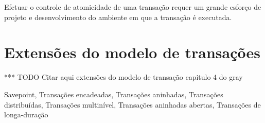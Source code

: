 \documentclass[11pt,twoside,a4paper]{book}
\begin{document}
Efetuar o controle de atomicidade de uma transação requer um grande esforço de projeto e desenvolvimento do ambiente em que a transação é executada.


\section{Extensões do modelo de transações}
\label{sec:extensoes}
*** TODO Citar aqui extensões do modelo de transação capitulo 4 do gray

Savepoint, Transações encadeadas, Transações aninhadas, Transações distribuídas, Transações multinível, Transações aninhadas abertas, Transações de longa-duração










\end{document}
